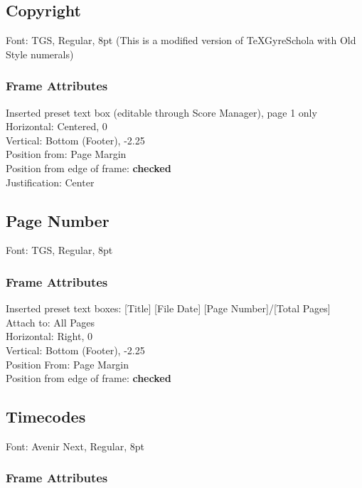 \documentclass[10pt,twoside]{article} %
\begin{document}
\subsection{Copyright}
\label{sec:copyright}

Font: TGS, Regular, 8pt (This is a modified version of TeXGyreSchola with Old Style numerals)

\subsubsection{Frame Attributes}
\label{sec:frame-attributes-3}

Inserted preset text box (editable through Score Manager), page 1 only\\
Horizontal: Centered, 0\\
Vertical: Bottom (Footer), -2.25\\
Position from: Page Margin\\
Position from edge of frame: \textbf{checked}\\
Justification: Center

\subsection{Page Number}
\label{sec:page-number}

Font: TGS, Regular, 8pt

\subsubsection{Frame Attributes}
\label{sec:frame-attributes-4}

Inserted preset text boxes: [Title] [File Date] [Page Number]/[Total Pages]\\
Attach to: All Pages\\
Horizontal: Right, 0\\
Vertical: Bottom (Footer), -2.25\\
Position From: Page Margin\\
Position from edge of frame: \textbf{checked}

\subsection{Timecodes}
\label{sec:timecodes}

Font: Avenir Next, Regular, 8pt

\subsubsection{Frame Attributes}
\label{sec:frame-attributes-5}
\end{document}
